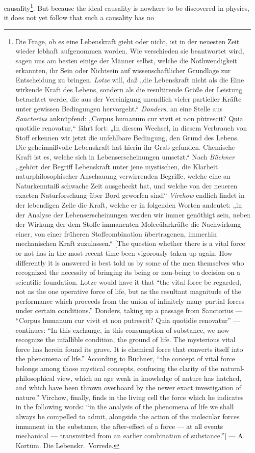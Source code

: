 \documentclass[12pt,a4paper]{book}
\begin{document}
causality\footnote{Die Frage, ob es eine Lebenskraft giebt oder nicht,
ist in der neuesten Zeit wieder lebhaft aufgenommen worden. Wie
verschieden sie beantwortet wird, sagen uns am besten einige der Männer
selbst, welche die Nothwendigkeit erkannten, ihr Sein oder Nichtsein auf
wissenschaftlicher Grundlage zur Entscheidung zu bringen. \emph{Lotze} will,
daß „die Lebenskraft nicht als die Eine wirkende Kraft des Lebens,
sondern als die resultirende Größe der Leistung betrachtet werde, die
aus der Vereinigung unendlich vieler partieller Kräfte unter gewissen
Bedingungen hervorgeht.“ \emph{Donders}, an eine Stelle aus
\emph{Sanctorius} anknüpfend: „Corpus humanum cur vivit et non pùtrescit? Quia quotidie
renovatur,“ fährt fort: „In diesem Wechsel, in diesem Verbrauch von
Stoff erkennen wir jetzt die unfehlbare Bedingung, den Grund des Lebens.
Die geheimnißvolle Lebenskraft hat hierin ihr Grab gefunden. Chemische
Kraft ist es, welche sich in Lebenserscheinungen umsetzt.“ Nach \emph{Büchner}
„gehört der Begriff Lebenskraft unter jene mystischen, die Klarheit
naturphilosophischer Anschauung verwirrenden Begriffe, welche eine an
Naturkenntniß schwache Zeit ausgeheckt hat, und welche von der neueren
exacten Naturforschung über Bord geworfen sind.“ \emph{Virchow} endlich findet
in der lebendigen Zelle die Kraft, welche er in folgenden Worten
andeutet: „in der Analyse der Lebenserscheinungen werden wir immer
genöthigt sein, neben der Wirkung der dem Stoffe immanenten
Molecülarkräfte die Nachwirkung einer, von einer früheren
Stoffcombination übertragenen, immerhin mechanischen Kraft
zuzulassen.“ [The question whether there is a vital force or not has in the
most recent time been vigorously taken up again. How differently it is answered
is best told us by some of the men themselves who recognized the necessity of
bringing its being or non-being to decision on a scientific foundation. Lotze
would have it that ``the vital force be regarded, not as the one operative
force of life, but as the resultant magnitude of the performance which proceeds
from the union of infinitely many partial forces under certain conditions.''
Donders, taking up a passage from Sanctorius --- ``Corpus humanum cur vivit et
non putrescit? Quia quotidie renovatur'' --- continues: ``In this exchange, in
this consumption of substance, we now recognize the infallible condition, the
ground of life. The mysterious vital force has herein found its grave. It is
chemical force that converts itself into the phenomena of life.'' According to
Büchner, ``the concept of vital force belongs among those mystical concepts,
confusing the clarity of the natural-philosophical view, which an age weak in
knowledge of nature has hatched, and which have been thrown overboard by the
newer exact investigation of nature.'' Virchow, finally, finds in the living
cell the force which he indicates in the following words: ``in the analysis of
the phenomena of life we shall always be compelled to admit, alongside the
action of the molecular forces immanent in the substance, the after-effect of a
force --- at all events mechanical --- transmitted from an earlier combination
of substance.''] --- A. Kortüm. Die Lebenskr.\ Vorrede.}. But because the ideal
causality is nowhere to be discovered in physics, it does not yet follow that
such a causality has no
\end{document}
